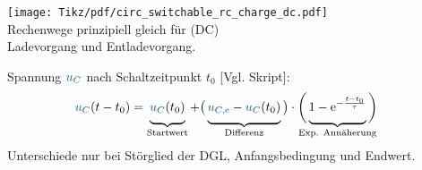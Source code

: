 {\begin{frame}[t]
\begin{minipage}{\textwidth}\centering%
\begin{minipage}[t][][t]{0.48\textwidth}\centering\vspace{0cm}%
    \texttt{[image: Tikz/pdf/circ\_switchable\_rc\_charge\_dc.pdf]}\\[1em]%
    {\flushleft%
    Rechenwege prinzipiell gleich für (DC) \\ Ladevorgang und Entladevorgang.%
    }%
\end{minipage}
\begin{minipage}[t][][t]{0.48\textwidth}\centering\vspace{0cm}%
\end{minipage}
\end{minipage}\hfill%
\begin{minipage}{\textwidth}\centering%
Spannung $\ecv{u_C}$ nach Schaltzeitpunkt $t_0$ [Vgl. Skript]:
\begin{align*}
    \ecv{u_C}(t-t_0) &= \underbrace{\ecv{u_C}(t_0) \vphantom{\Big|}}_{\text{Startwert}} + \big(\underbrace{\ecv{u_{C,\mathrm{e}}} - \ecv{u_C}(t_0) \vphantom{\Big|}}_{\text{Differenz}}\big) \cdot \bigg( \underbrace{ 1- \mathrm{e}^{-\frac{t-t_0}{\tau}} \vphantom{\Big|}}_{\text{\clap{Exp. Annäherung}}} \bigg)
\end{align*}
Unterschiede nur bei Störglied der DGL, Anfangsbedingung und Endwert.
\end{minipage}
\end{frame}
}%



